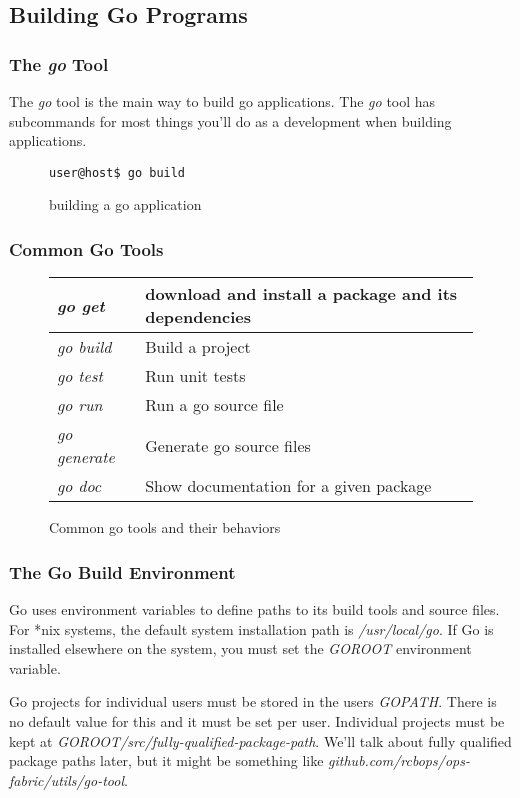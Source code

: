 \documentclass{beamer}
\begin{document}
\subsection{Building Go Programs}

\begin{frame}[fragile]
  \frametitle{The \emph{go} Tool}
  The \emph{go} tool is the main way to build go applications. The
  \emph{go} tool has subcommands for most things you'll do as a
  development when building applications.

  \begin{figure}
\begin{lstlisting}
user@host$ go build
\end{lstlisting}
    \caption{building a go application}
  \end{figure}
\end{frame}

\begin{frame}[fragile]
  \frametitle{Common Go Tools}
  \begin{figure}
  \begin{tabular}{|l|p{3in}|}
    \hline
    \emph{go get} & download and install a package and its dependencies \\
    \hline
    \emph{go build} & Build a project \\
    \hline
    \emph{go test} & Run unit tests \\
    \hline
    \emph{go run} & Run a go source file \\
    \hline
    \emph{go generate} & Generate go source files \\
    \hline
    \emph{go doc} & Show documentation for a given package \\
    \hline
  \end{tabular}
  \caption{Common go tools and their behaviors}
  \end{figure}
\end{frame}

\begin{frame}
  \frametitle{The Go Build Environment}
  Go uses environment variables to define paths to its build tools
  and source files.  For *nix systems, the default system installation
  path is \emph{/usr/local/go}.  If Go is installed elsewhere on the
  system, you must set the \emph{GOROOT} environment variable.

  Go projects for individual users must be stored in the users
  \emph{GOPATH}.  There is no default value for this and it must be
  set per user.  Individual projects must be kept at
  \emph{GOROOT/src/fully-qualified-package-path}.  We'll talk about
  fully qualified package paths later, but it might be something like
  \emph{github.com/rcbops/ops-fabric/utils/go-tool}.
\end{frame}
\end{document}
